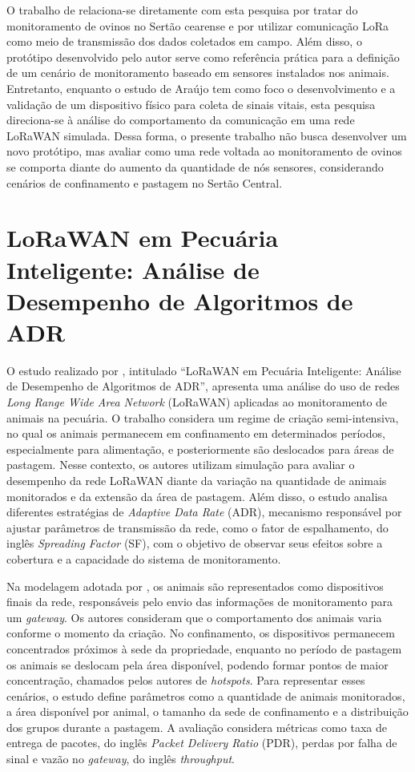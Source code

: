 O trabalho de  relaciona-se diretamente com esta pesquisa por tratar do monitoramento de ovinos no Sertão cearense e por utilizar comunicação LoRa como meio de transmissão dos dados coletados em campo. Além disso, o protótipo desenvolvido pelo autor serve como referência prática para a definição de um cenário de monitoramento baseado em sensores instalados nos animais. Entretanto, enquanto o estudo de Araújo tem como foco o desenvolvimento e a validação de um dispositivo físico para coleta de sinais vitais, esta pesquisa direciona-se à análise do comportamento da comunicação em uma rede LoRaWAN simulada. Dessa forma, o presente trabalho não busca desenvolver um novo protótipo, mas avaliar como uma rede voltada ao monitoramento de ovinos se comporta diante do aumento da quantidade de nós sensores, considerando cenários de confinamento e pastagem no Sertão Central.

\section{LoRaWAN em Pecuária Inteligente: Análise de Desempenho de Algoritmos de ADR}
\label{sec:tr-macedo2023}

O estudo realizado por , intitulado ``LoRaWAN em Pecuária Inteligente: Análise de Desempenho de Algoritmos de ADR'', apresenta uma análise do uso de redes \textit{Long Range Wide Area Network} (LoRaWAN) aplicadas ao monitoramento de animais na pecuária. O trabalho considera um regime de criação semi-intensiva, no qual os animais permanecem em confinamento em determinados períodos, especialmente para alimentação, e posteriormente são deslocados para áreas de pastagem. Nesse contexto, os autores utilizam simulação para avaliar o desempenho da rede LoRaWAN diante da variação na quantidade de animais monitorados e da extensão da área de pastagem. Além disso, o estudo analisa diferentes estratégias de \textit{Adaptive Data Rate} (ADR), mecanismo responsável por ajustar parâmetros de transmissão da rede, como o fator de espalhamento, do inglês \textit{Spreading Factor} (SF), com o objetivo de observar seus efeitos sobre a cobertura e a capacidade do sistema de monitoramento.

Na modelagem adotada por , os animais são representados como dispositivos finais da rede, responsáveis pelo envio das informações de monitoramento para um \textit{gateway}. Os autores consideram que o comportamento dos animais varia conforme o momento da criação. No confinamento, os dispositivos permanecem concentrados próximos à sede da propriedade, enquanto no período de pastagem os animais se deslocam pela área disponível, podendo formar pontos de maior concentração, chamados pelos autores de \textit{hotspots}. Para representar esses cenários, o estudo define parâmetros como a quantidade de animais monitorados, a área disponível por animal, o tamanho da sede de confinamento e a distribuição dos grupos durante a pastagem. A avaliação considera métricas como taxa de entrega de pacotes, do inglês \textit{Packet Delivery Ratio} (PDR), perdas por falha de sinal e vazão no \textit{gateway}, do inglês \textit{throughput}.

